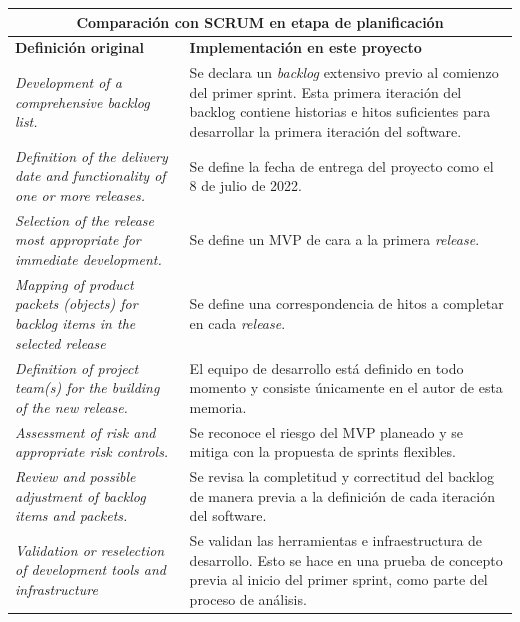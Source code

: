 \renewcommand{\arraystretch}{1.5}

\begin{table}[]
    \centering
    \begin{tabular}{p{5cm} p{6cm}}
        \multicolumn{2}{c}{\textbf{Comparación con SCRUM en etapa de planificación}} \\
        \hline 
        \textbf{Definición original} & \textbf{Implementación en este proyecto} \\ \hline \hline
        
        \textit{Development of a comprehensive backlog list.} & Se declara un \textit{backlog} extensivo previo al comienzo del primer sprint. Esta primera iteración del backlog contiene historias e hitos suficientes para desarrollar la primera iteración del software. \\ \hline
        
        \textit{Definition of the delivery date and functionality of one or more releases.} & Se define la fecha de entrega del proyecto como el 8 de julio de 2022. \\ \hline
        
        \textit{Selection of the release most appropriate for immediate development.} & Se define un MVP de cara a la primera \textit{release}. \\ \hline
        
        \textit{Mapping of product packets (objects) for backlog items in the selected release} & Se define una correspondencia de hitos a completar en cada \textit{release}. \\ \hline
        
        \textit{Definition of project team(s) for the building of the new release.} & El equipo de desarrollo está definido en todo momento y consiste únicamente en el autor de esta memoria. \\ \hline
        
        \textit{Assessment of risk and appropriate risk controls.} & Se reconoce el riesgo del MVP planeado y se mitiga con la propuesta de sprints flexibles. \\ \hline
        
        \textit{Review and possible adjustment of backlog items and packets.} & Se revisa la completitud y correctitud del backlog de manera previa a la definición de cada iteración del software. \\ \hline
        
        \textit{Validation or reselection of development tools and infrastructure} & Se validan las herramientas e infraestructura de desarrollo. Esto se hace en una prueba de concepto previa al inicio del primer sprint, como parte del proceso de análisis. \\ \hline
        

\end{tabular}
\end{table}
